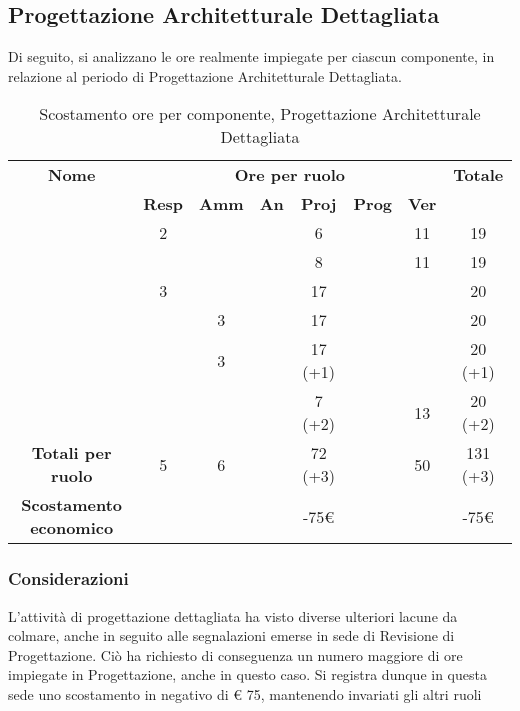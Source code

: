 \newpage
\subsection{Progettazione Architetturale Dettagliata}

Di seguito, si analizzano le ore realmente impiegate per ciascun componente, in relazione al periodo di Progettazione Architetturale Dettagliata.

\begin{table}[H]
	\begin{center}
		\begin{tabular}{|c|c|c|c|c|c|c|c|}
			\hline
			\textbf{Nome} & \multicolumn{6}{c|}{\textbf{Ore per ruolo}} & \textbf{Totale} \\\cline{2-7}
			& \textbf{Resp} & \textbf{Amm} & \textbf{An} & \textbf{Proj} & \textbf{Prog} & \textbf{Ver} & \\
			\hline
			\MC			&	2	&		&		&	6	&		&	11	&	19	\\
			\hline
			\AN			&		&		&		&	8	&   	&	11	& 	19	\\
			\hline
			\DAN		&	3	&		&		&	17	&		&		&	20	\\
			\hline
			\AS			&		&	3	&	 	&	17	&	 	& 		&	20	\\
			\hline
			\NS 		&		&	3	&		&	17 (+1)	&		& 		&	20 (+1)	\\
			\hline
			\DS			& 		&		&		&	7 (+2)	&		&	13	&	20 (+2)	\\
			\hline
			\textbf{Totali per ruolo}	& 	5 	&	6 	&		&	72 (+3)	&		&	50 	&	131 (+3)	\\
			\hline
			\textbf{Scostamento economico}	& 		&		&		&	-75€	&		&		&	-75€	\\
			\hline
		\end{tabular}
	\end{center}
	\caption{Scostamento ore per componente, Progettazione Architetturale Dettagliata}
\end{table}


\subsubsection{Considerazioni}
L'attività di progettazione dettagliata ha visto diverse ulteriori lacune da colmare, anche in seguito alle segnalazioni emerse in sede di Revisione di Progettazione. Ciò ha richiesto di conseguenza un numero maggiore di ore impiegate in Progettazione, anche in questo caso. Si registra dunque in questa sede uno scostamento in negativo di € 75, mantenendo invariati gli altri ruoli

